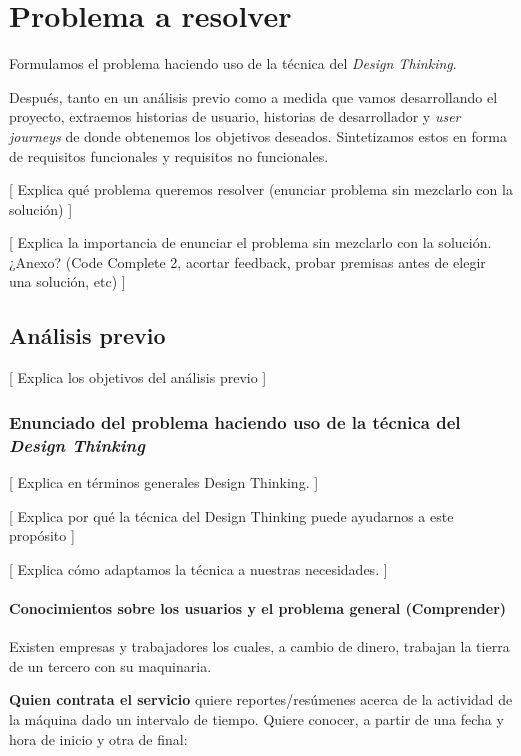 \chapter{Problema a resolver}

Formulamos el problema haciendo uso de la técnica del \textit{Design Thinking}.

Después, tanto en un análisis previo como a medida que vamos desarrollando el 
proyecto, extraemos historias de usuario, historias de desarrollador y
\textit{user journeys} de donde obtenemos los objetivos deseados. Sintetizamos
estos en forma de requisitos funcionales y requisitos no funcionales.

[ Explica qué problema queremos resolver (enunciar problema sin mezclarlo con la solución) ]

[ Explica la importancia de enunciar el problema sin mezclarlo con la solución. ¿Anexo? (Code Complete 2, acortar feedback, probar premisas antes de elegir una solución, etc) ]

\section{Análisis previo}

[ Explica los objetivos del análisis previo ]

\subsection{Enunciado del problema haciendo uso de la técnica del \textit{Design Thinking}}

[ Explica en términos generales Design Thinking. ]

[ Explica por qué la técnica del Design Thinking puede ayudarnos a este propósito ]

[ Explica cómo adaptamos la técnica a nuestras necesidades. ]

\subsubsection{Conocimientos sobre los usuarios y el problema general (Comprender)}

Existen empresas y trabajadores los cuales, a cambio de dinero, trabajan la
tierra de un tercero con su maquinaria.

\textbf{Quien contrata el servicio} quiere reportes/resúmenes acerca de la actividad
de la máquina dado un intervalo de tiempo. Quiere conocer, a partir de una fecha y hora de inicio y otra de final:

